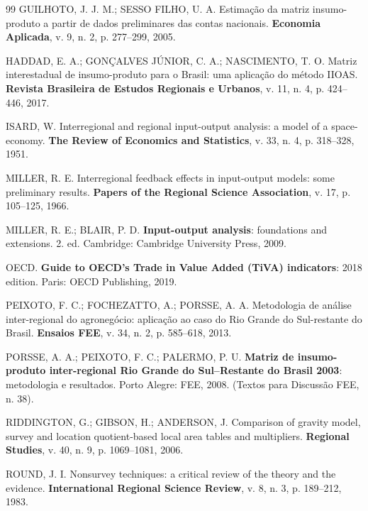 \documentclass[11pt,a4paper]{article}
\begin{document}
\begin{thebibliography}{99}
GUILHOTO, J. J. M.; SESSO FILHO, U. A. Estimação da matriz insumo-produto a
partir de dados preliminares das contas nacionais. \textbf{Economia Aplicada},
v. 9, n. 2, p. 277--299, 2005.

HADDAD, E. A.; GONÇALVES JÚNIOR, C. A.; NASCIMENTO, T. O. Matriz interestadual
de insumo-produto para o Brasil: uma aplicação do método IIOAS.
\textbf{Revista Brasileira de Estudos Regionais e Urbanos}, v. 11, n. 4,
p. 424--446, 2017.

ISARD, W. Interregional and regional input-output analysis: a model of a
space-economy. \textbf{The Review of Economics and Statistics}, v. 33, n. 4,
p. 318--328, 1951.

MILLER, R. E. Interregional feedback effects in input-output models: some
preliminary results. \textbf{Papers of the Regional Science Association},
v. 17, p. 105--125, 1966.

MILLER, R. E.; BLAIR, P. D. \textbf{Input-output analysis}: foundations and
extensions. 2. ed. Cambridge: Cambridge University Press, 2009.

OECD. \textbf{Guide to OECD's Trade in Value Added (TiVA) indicators}: 2018
edition. Paris: OECD Publishing, 2019.

PEIXOTO, F. C.; FOCHEZATTO, A.; PORSSE, A. A. Metodologia de análise
inter-regional do agronegócio: aplicação ao caso do Rio Grande do
Sul-restante do Brasil. \textbf{Ensaios FEE}, v. 34, n. 2, p. 585--618, 2013.

PORSSE, A. A.; PEIXOTO, F. C.; PALERMO, P. U. \textbf{Matriz de insumo-produto
inter-regional Rio Grande do Sul--Restante do Brasil 2003}: metodologia e
resultados. Porto Alegre: FEE, 2008. (Textos para Discussão FEE, n. 38).

RIDDINGTON, G.; GIBSON, H.; ANDERSON, J. Comparison of gravity model, survey
and location quotient-based local area tables and multipliers. \textbf{Regional
Studies}, v. 40, n. 9, p. 1069--1081, 2006.

ROUND, J. I. Nonsurvey techniques: a critical review of the theory and the
evidence. \textbf{International Regional Science Review}, v. 8, n. 3,
p. 189--212, 1983.


\end{thebibliography}
\end{document}
